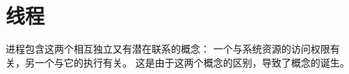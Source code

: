 
\chapter{线程}
{
    进程包含这两个相互独立又有潜在联系的概念：
    一个与系统资源的访问权限有关，另一个与它的执行有关。
    这是由于这两个概念的区别，导致了概念的诞生。

    
    
    
    
}

\cleardoublepage

\endinput

